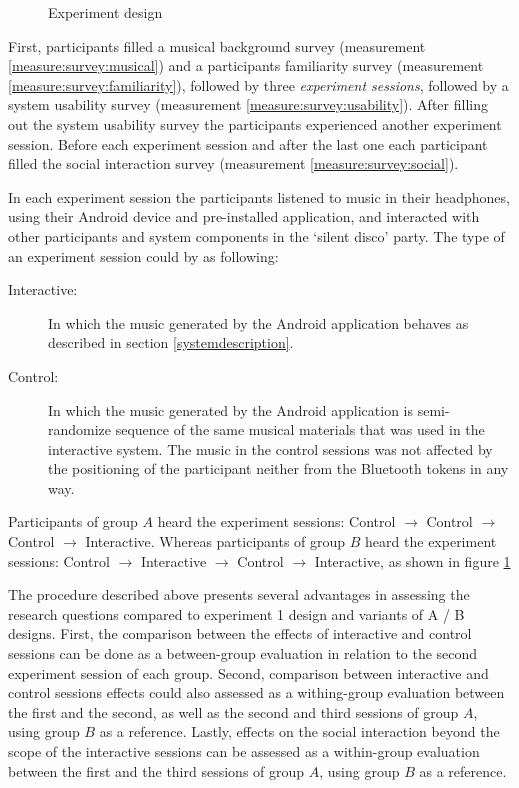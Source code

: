 \documentclass[a4paper,11pt]{article}
\newcommand{\definition}[1]{\emph{#1}}
\begin{document}
{\begin{figure}[!htb]
	\centering
	\def\svgwidth{0.9\textwidth}
  	
	\caption{Experiment design}\label{fig:experiment}
\end{figure}

First, participants filled a musical background survey (measurement \ref{measure:survey:musical}) and a participants familiarity survey (measurement \ref{measure:survey:familiarity}), followed by three \definition{experiment sessions}, followed by a system usability survey (measurement \ref{measure:survey:usability}).
After filling out the system usability survey the participants experienced another experiment session.
Before each experiment session and after the last one each participant filled the social interaction survey (measurement \ref{measure:survey:social}).

In each experiment session the participants listened to music in their headphones, using their Android device and pre-installed application, and interacted with other participants and system components in the `silent disco' party.
The type of an experiment session could by as following:

\begin{description}
	\item[Interactive:] In which the music generated by the Android application behaves as described in section \ref{systemdescription}.
	\item[Control:] In which the music generated by the Android application is semi-randomize sequence of the same musical materials that was used in the interactive system.
        The music in the control sessions was not affected by the positioning of the participant neither from the Bluetooth tokens in any way.
\end{description}

Participants of group $A$ heard the experiment sessions: Control $\rightarrow$ Control $\rightarrow$ Control $\rightarrow$ Interactive.
Whereas participants of group $B$ heard the experiment sessions: Control $\rightarrow$ Interactive $\rightarrow$ Control $\rightarrow$ Interactive, as shown in figure \ref{fig:experiment}

The procedure described above presents several advantages in assessing the research questions compared to experiment 1 design and variants of A / B designs.
First, the comparison between the effects of interactive and control sessions can be done as a between-group evaluation in relation to the second experiment session of each group.
Second, comparison between interactive and control sessions effects could also assessed as a withing-group evaluation between the first and the second, as well as the second and third sessions of group $A$, using group $B$ as a reference.
Lastly, effects on the social interaction beyond the scope of the interactive sessions can be assessed as a within-group evaluation between the first and the third sessions of group $A$, using group $B$ as a reference.

}
\end{document}
